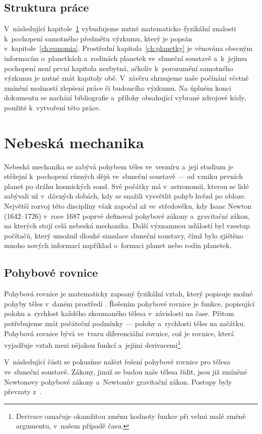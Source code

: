 \documentclass[A4paper, 12pt, oneside, openany]{book}
\begin{document}
\section*{Struktura práce}
V~následující kapitole~\ref{ch:celmech} vybudujeme nutné matematicko--fyzikální znalosti k~pochopení samotného předmětu výzkumu, který je popsán v~kapitole~\ref{ch:eunomia}. Prostřední kapitola~\ref{ch:planetky} je věnována obecným informacím o~planetkách a~rodinách planetek ve~sluneční soustavě a~k~jejímu pochopení není první kapitola nezbytná, ačkoliv k~porozumění samotného výzkumu je nutné znát kapitoly obě. V~závěru shrnujeme naše počínání včetně zmínění možností zlepšení práce či budoucího výzkumu. Na úplném konci dokumentu se nachází bibliografie a~přílohy obsahující vybrané zdrojové kódy, použité k~vytvoření této práce.

\chapter{Nebeská mechanika} \label{ch:celmech}
Nebeská mechanika se zabývá pohybem těles ve~vesmíru a~její studium je stěžejní k~pochopení různých dějů ve~sluneční soustavě --- od vzniku prvních planet po dráhu kosmických sond. Své počátky má v~astronomii, kterou se lidé zabývali už v~dávných dobách, kdy se snažili vysvětlit pohyb hvězd po obloze. Největší rozvoj této disciplíny však započal až ve~středověku, kdy Isaac Newton (1642--1726) v~roce 1687 poprvé definoval pohybové zákony a~gravitační zákon, na kterých stojí celá nebeská mechanika. Další významnou událostí byl vzestup počítačů, který umožnil dlouhé simulace sluneční soustavy, čímž bylo zjištěno mnoho nových informací například o~formaci planet nebo rodin planetek.

\section{Pohybové rovnice}
Pohybová rovnice je matematicky zapsaný fyzikální vztah, který popisuje možné pohyby těles v~daném prostředí \cite{wiki:eqm}. Řešením pohybové rovnice je funkce, popisující polohu a~rychlost každého zkoumaného tělesa v~závislosti na čase. Přitom potřebujeme znát počáteční podmínky --- polohy a~rychlosti těles na začátku. Pohybová rovnice bývá ve~tvaru diferenciální rovnice, což je rovnice, která vyjadřuje vztah mezi nějakou funkcí a~jejími derivacemi\footnote{Derivace označuje okamžitou změnu hodnoty funkce při velmi malé změně argumentu, v~našem případě času.}.

V~následující části se pokusíme nalézt řešení pohybové rovnice pro tělesa ve~sluneční soustavě. Zákony, jimiž se budou naše tělesa řídit, jsou již zmíněné Newtonovy pohybové zákony a~Newtonův gravitační zákon. Postupy byly převzaty z~\cite{murray00}.
\end{document}
